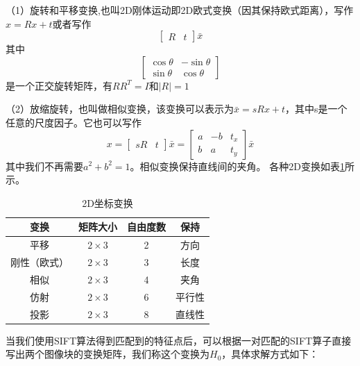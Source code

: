 （1）旋转和平移变换,也叫2D刚体运动即2D欧式变换（因其保持欧式距离），写作\(x={Rx+t}\)或者写作
\begin{equation}
	\begin{bmatrix}
	R & t
	\end{bmatrix}
	\bar{x}
\end{equation}
其中
\begin{equation}
	\begin{bmatrix}
	\cos{\theta} & -\sin{\theta} \\
	\sin{\theta} & \cos{\theta}
	\end{bmatrix}
\end{equation}
是一个正交旋转矩阵，有\(RR^T = I\)和\(|R| = 1\)

（2）放缩旋转，也叫做相似变换，该变换可以表示为\({\bar{x}}={sRx+t}\)，其中s是一个任意的尺度因子。它也可以写作
\begin{equation}
	x ={ 
	\begin{bmatrix}
	sR & t
	\end{bmatrix}
	\bar{x}
	}
	={
	\begin{bmatrix}
	a & -b & t_x \\
	b & a & t_y
	\end{bmatrix}
	\bar{x}
	}
\end{equation}
其中我们不再需要\(a^2 + b^2 = 1\)。相似变换保持直线间的夹角。
各种2D变换如表\ref{2dtrans}所示。

\begin{table}[h]
\caption{2D坐标变换}
\label{2dtrans}
\centering
\begin{tabular}{|c|c|c|c|}
\hline
\textbf{变换} & \textbf{矩阵大小} & \textbf{自由度数} & \textbf{保持} \\ \hline
平移          &   \(2\times{3}\)	& 2             & 方向          \\ \hline
刚性（欧式）    &   \(2\times{3}\) & 3             & 长度          \\ \hline
相似          &   \(2\times{3}\)  & 4             & 夹角          \\ \hline
仿射          &   \(2\times{3}\)  & 6             & 平行性         \\ \hline
投影          &   \(2\times{3}\)   & 8             & 直线性         \\ \hline
\end{tabular}
\end{table}


当我们使用SIFT算法得到匹配到的特征点后，可以根据一对匹配的SIFT算子直接写出两个图像块的变换矩阵，我们称这个变换为\(H_0\)，具体求解方式如下：


